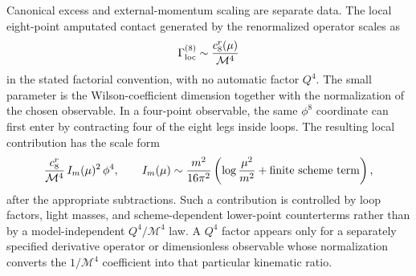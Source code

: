 Canonical excess and external-momentum scaling are separate data.  The local
eight-point amputated contact generated by the renormalized operator scales as
\[
  \Gamma^{(8)}_{\rm loc}
  \sim
  \frac{c_8^r(\mu)}{\mathcal M^4}
\]
in the stated factorial convention, with no automatic factor \(Q^4\).  The
small parameter is the Wilson-coefficient dimension together with the
normalization of the chosen observable.  In a four-point observable, the same
\(\phi^8\) coordinate can first enter by contracting four of the eight legs
inside loops.  The resulting local contribution has the scale form
\[
  \frac{c_8^r}{\mathcal M^4}\, I_m(\mu)^2\,\phi^4,
  \qquad
  I_m(\mu)\sim \frac{m^2}{16\pi^2}
  \left(\log\frac{\mu^2}{m^2}+\hbox{finite scheme term}\right),
\]
after the appropriate subtractions.  Such a contribution is controlled by
loop factors, light masses, and scheme-dependent lower-point counterterms
rather than by a model-independent \(Q^4/\mathcal M^4\) law.  A \(Q^4\) factor
appears only for a separately specified derivative operator or dimensionless
observable whose normalization converts the \(1/\mathcal M^4\) coefficient
into that particular kinematic ratio.

